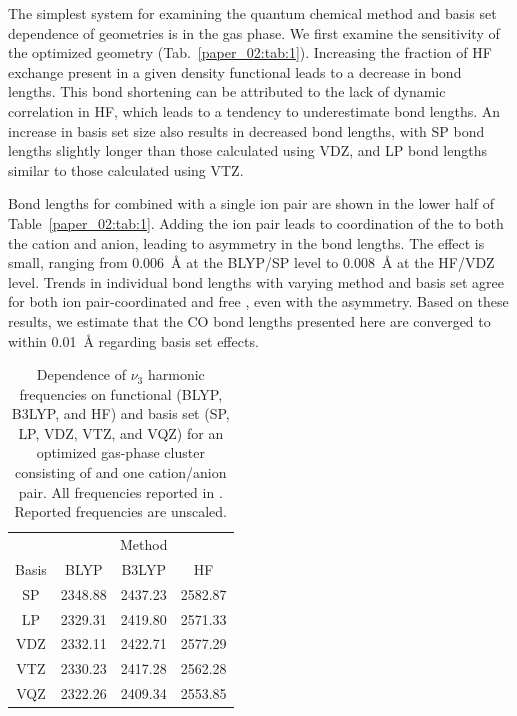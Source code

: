 \documentclass[%
  class = book,%
  crop = false,%
  float = true,%
  multi = true,%
  preview = false,%
]{standalone}
\begin{document}
The simplest system for examining the quantum chemical method and basis set dependence of geometries is  in the gas phase. We first examine the sensitivity of the optimized geometry (Tab.~\ref{paper_02:tab:1}). Increasing the fraction of HF exchange present in a given density functional leads to a decrease in bond lengths. This bond shortening can be attributed to the lack of dynamic correlation in HF, which leads to a tendency to underestimate bond lengths. An increase in basis set size also results in decreased bond lengths, with SP bond lengths slightly longer than those calculated using VDZ, and LP bond lengths similar to those calculated using VTZ.

Bond lengths for  combined with a single ion pair are shown in the lower half of Table~\ref{paper_02:tab:1}. Adding the ion pair leads to coordination of the  to both the cation and anion, leading to asymmetry in the  bond lengths. The effect is small, ranging from \SI{0.006}{\angstrom} at the BLYP/SP level to \SI{0.008}{\angstrom} at the HF/VDZ level. Trends in individual  bond lengths with varying method and basis set agree for both ion pair-coordinated  and free , even with the asymmetry. Based on these results, we estimate that the CO bond lengths presented here are converged to within \SI{0.01}{\angstrom} regarding basis set effects.

\begin{table}
  \centering
  \caption[Functional and basis set dependence of \texorpdfstring{ \(\nu_3\)}{carbon dioxide asymmetric stretch} frequencies]{Dependence of \(\nu_3\) harmonic frequencies on functional (BLYP, B3LYP, and HF) and basis set (SP, LP, VDZ, VTZ, and VQZ) for an optimized gas-phase cluster consisting of  and one cation/anion pair. All frequencies reported in \si{\wavenumber}. Reported frequencies are unscaled.}
  \label{paper_02:tab:2}
  \begin{tabular}{cccc}
    \toprule
    & \multicolumn{3}{c}{Method} \\
    Basis & BLYP & B3LYP & HF \\
    \midrule
    SP & 2348.88 & 2437.23 & 2582.87 \\
    LP & 2329.31 & 2419.80 & 2571.33 \\
    VDZ & 2332.11 & 2422.71 & 2577.29 \\
    VTZ & 2330.23 & 2417.28 & 2562.28 \\
    VQZ & 2322.26 & 2409.34 & 2553.85 \\
    \bottomrule
  \end{tabular}
\end{table}
\end{document}
